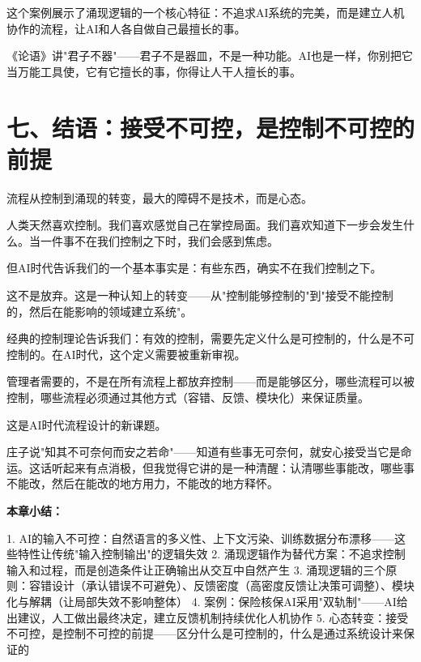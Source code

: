 这个案例展示了涌现逻辑的一个核心特征：不追求AI系统的完美，而是建立人机协作的流程，让AI和人各自做自己最擅长的事。

《论语》讲"君子不器"——君子不是器皿，不是一种功能。AI也是一样，你别把它当万能工具使，它有它擅长的事，你得让人干人擅长的事。

\section{七、结语：接受不可控，是控制不可控的前提}


流程从控制到涌现的转变，最大的障碍不是技术，而是心态。

人类天然喜欢控制。我们喜欢感觉自己在掌控局面。我们喜欢知道下一步会发生什么。当一件事不在我们控制之下时，我们会感到焦虑。

但AI时代告诉我们的一个基本事实是：有些东西，确实不在我们控制之下。

这不是放弃。这是一种认知上的转变——从"控制能够控制的"到"接受不能控制的，然后在能影响的领域建立系统"。

经典的控制理论告诉我们：有效的控制，需要先定义什么是可控制的，什么是不可控制的。在AI时代，这个定义需要被重新审视。

管理者需要的，不是在所有流程上都放弃控制——而是能够区分，哪些流程可以被控制，哪些流程必须通过其他方式（容错、反馈、模块化）来保证质量。

这是AI时代流程设计的新课题。

庄子说"知其不可奈何而安之若命"——知道有些事无可奈何，就安心接受当它是命运。这话听起来有点消极，但我觉得它讲的是一种清醒：认清哪些事能改，哪些事不能改，然后在能改的地方用力，不能改的地方释怀。


\textbf{本章小结：}

1. AI的输入不可控：自然语言的多义性、上下文污染、训练数据分布漂移——这些特性让传统"输入控制输出"的逻辑失效
2. 涌现逻辑作为替代方案：不追求控制输入和过程，而是创造条件让正确输出从交互中自然产生
3. 涌现逻辑的三个原则：容错设计（承认错误不可避免）、反馈密度（高密度反馈让决策可调整）、模块化与解耦（让局部失效不影响整体）
4. 案例：保险核保AI采用"双轨制"——AI给出建议，人工做出最终决定，建立反馈机制持续优化人机协作
5. 心态转变：接受不可控，是控制不可控的前提——区分什么是可控制的，什么是通过系统设计来保证的
